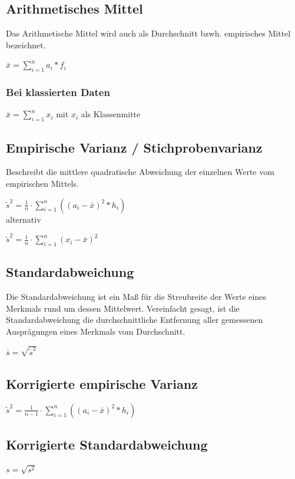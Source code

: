 \documentclass{article}
\begin{document}
\subsection{Arithmetisches Mittel}
Das Arithmetische Mittel wird auch als Durchschnitt bzwh. empirisches Mittel bezeichnet.

$
	\bar{x} = \sum_{i=1}^n a_i * f_i
$

\subsubsection{Bei klassierten Daten}

$
\bar{x} = \sum_{i=1}^n x_i
$
mit $ x_i $ als Klassenmitte

\subsection{Empirische Varianz / Stichprobenvarianz}
Beschreibt die mittlere quadratische Abweichung der einzelnen Werte vom empirischen Mittels.

	$
	\tilde{s}^2
	=
	\frac{1}{n} \cdot
	\sum_{i=1}^n (
	(a_i - \bar{x})^2* h_i)
	$
\\
alternativ

$
\tilde{s}^2 = \frac{1}{n} \cdot \sum_{i=1}^n (x_i - \bar{x})^2
$


\subsection{Standardabweichung}
 Die Standardabweichung ist ein Maß für die Streubreite der Werte eines Merkmals rund um dessen Mittelwert.
Vereinfacht gesagt, ist die Standardabweichung die durchschnittliche Entfernung aller gemessenen Ausprägungen eines Merkmals vom Durchschnitt.

$
\bar{s} = \sqrt{\tilde{s}^2}
$

\subsection{Korrigierte empirische Varianz}

$
\tilde{s}^2 = \frac{1}{n-1} \cdot \sum_{i=1}^n ((a_i - \bar{x})^2* h_i)
$

\subsection{Korrigierte Standardabweichung}

$
s = \sqrt{s^2}
$



\end{document}
